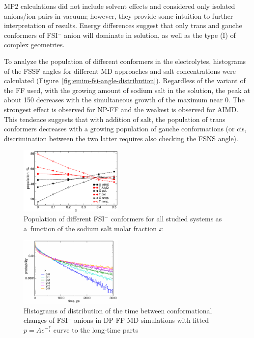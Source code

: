 MP2 calculations did not include solvent effects and considered only isolated anions/ion pairs in vacuum; however, they provide some intuition to further interpretation of results. Energy differences suggest that only trans and gauche conformers of FSI$^{-}$ anion will dominate in solution, as well as the type (I) of complex geometries.

To analyze the population of different conformers in the electrolytes, histograms of the FSSF angles for different MD approaches and salt concentrations were calculated (Figure~\ref{fig:emim-fsi-angle-distribution}). Regardless of the variant of the FF used, with the growing amount of sodium salt in the solution, the peak at about 150{\degree} decreases with the simultaneous growth of the maximum near 0{\degree}. The strongest effect is observed for NP-FF and the weakest is observed for AIMD. This tendence suggests that with addition of salt, the population of trans conformers decreases with a growing population of gauche conformations (or cis, discrimination between the two latter requires also checking the FSNS angle).

\begin{figure}[H]
    \centering
    \includegraphics[width=0.45\textwidth]{img/3-structural-data-from-md-simulations/1-emim-fsi/conformers/conformer-population.png}
    \singlespacing
    \caption{Population of different FSI$^{-}$ conformers for all studied systems as a~function of the sodium salt molar fraction $x$}
    \label{fig:emim-fsi-conformer-population}
\end{figure}

\begin{figure}[H]
    \centering
    \includegraphics[width=0.45\textwidth]{img/3-structural-data-from-md-simulations/1-emim-fsi/conformers/conformer-changes-distribution.png}
    \singlespacing
    \caption{Histograms of distribution of the time between conformational changes of FSI$^{-}$ anions in DP-FF MD simulations with fitted $p = Ae^{-\frac{\tau}{t}}$ curve to the long-time parts}
    \label{fig:emim-fsi-conformer-changes-distribution}
\end{figure}

